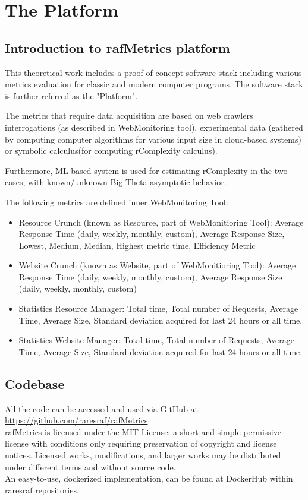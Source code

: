 \chapter{The Platform}


\section{Introduction to rafMetrics platform}
This theoretical work includes a proof-of-concept software stack including various metrics evaluation for classic and modern computer programs. The software stack is further referred as the "Platform".


The metrics that require data acquisition are based on web crawlers interrogations (as described in WebMonitoring tool), experimental data (gathered by computing computer algorithms for various input size in cloud-based systems) or symbolic calculus(for computing rComplexity calculus).

Furthermore, ML-based system is used for estimating rComplexity in the two cases, with known/unknown Big-Theta asymptotic behavior. 

The following metrics are defined inner WebMonitoring Tool:
\begin{itemize}
	\item Resource Crunch (known as Resource, part of WebMonitioring Tool): Average Response Time (daily, weekly, monthly, custom), Average Response Size, Lowest, Medium, Median, Highest metric time, Efficiency Metric	
	\item Website Crunch (known as Website, part of WebMonitioring Tool): Average Response Time (daily, weekly, monthly, custom), Average Response Size (daily, weekly, monthly, custom)
	\item Statistics Resource Manager: Total time, Total number of Requests, Average Time, Average Size, Standard deviation acquired for last 24 hours or all time.
	\item Statistics Website Manager: Total time, Total number of Requests, Average Time, Average Size, Standard deviation acquired for last 24 hours or all time.

	

\end{itemize}


\section{Codebase}
All the code can be accessed and used via GitHub at \href{https://github.com/raresraf/rafMetrics}{https://github.com/raresraf/rafMetrics}.
\\
rafMetrics is licensed under the MIT License: a short and simple permissive license with conditions only requiring preservation of copyright and license notices. Licensed works, modifications, and larger works may be distributed under different terms and without source code.
\\
An easy-to-use, dockerized implementation, can be found at DockerHub within raresraf repositories.


